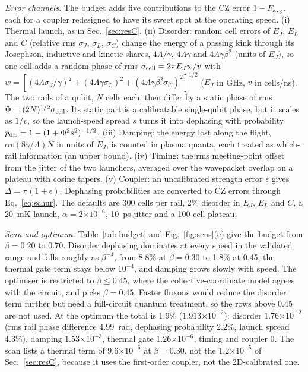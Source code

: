 \documentclass[10pt,twocolumn,letterpaper]{article}
\newcommand{\ee}[1]{\ensuremath{\times10^{#1}}}
\begin{document}
\emph{Error channels.} The budget adds five contributions to the CZ error $1-F_{\rm avg}$, each for a coupler
redesigned to have its sweet spot at the operating speed. (i) Thermal launch, as in Sec.~\ref{sec:resC}. (ii) Disorder:
random cell errors of $E_J$, $E_L$ and $C$ (relative rms $\sigma_J$, $\sigma_L$, $\sigma_C$) change the energy of a
passing kink through its Josephson, inductive and kinetic shares, $4\Lambda/\gamma$, $4\Lambda\gamma$ and
$4\Lambda\gamma\beta^2$ (units of $E_J$), so one cell adds a random phase of rms $\sigma_{\rm cell}=2\pi E_Jw/v$ with
$w=[(4\Lambda\sigma_J/\gamma)^2+(4\Lambda\gamma\sigma_L)^2+(4\Lambda\gamma\beta^2\sigma_C)^2]^{1/2}$ ($E_J$ in GHz, $v$
in cells/ns). The two rails of a qubit, $N$ cells each, then differ by a static phase of rms
$\Phi=(2N)^{1/2}\sigma_{\rm cell}$. Its static part is a calibratable single-qubit phase, but it scales as $1/v$, so the
launch-speed spread $s$ turns it into dephasing with probability $p_{\rm dis}=1-(1+\Phi^2s^2)^{-1/2}$. (iii) Damping:
the energy lost along the flight, $\alpha v(8\gamma/\Lambda)N$ in units of $E_J$, is counted in plasma quanta, each
treated as which-rail information (an upper bound). (iv) Timing: the rms meeting-point offset from the jitter of the two
launchers, averaged over the wavepacket overlap on a plateau with cosine tapers. (v) Coupler: an uncalibrated strength
error $\epsilon$ gives $\Delta=\pi(1+\epsilon)$. Dephasing probabilities are converted to CZ errors through
Eq.~\eqref{eq:schur}. The defaults are 300 cells per rail, 2\% disorder in $E_J$, $E_L$ and $C$, a 20~mK launch,
$\alpha=2\ee{-6}$, 10~ps jitter and a 100-cell plateau.

\emph{Scan and optimum.} Table~\ref{tab:budget} and Fig.~\ref{fig:sens}(e) give the budget from $\beta=0.20$ to 0.70.
Disorder dephasing dominates at every speed in the validated range and falls roughly as $\beta^{-4}$, from 8.8\% at
$\beta=0.30$ to 1.8\% at 0.45; the thermal gate term stays below $10^{-4}$, and damping grows slowly with speed. The
optimiser is restricted to $\beta\le0.45$, where the collective-coordinate model agrees with the circuit, and picks
$\beta=0.45$. Faster fluxons would reduce the disorder term further but need a full-circuit quantum treatment, so the
rows above 0.45 are not used. At the optimum the total is 1.9\% ($1.913\ee{-2}$): disorder $1.76\ee{-2}$ (rms rail phase
difference 4.99~rad, dephasing probability 2.2\%, launch spread 4.3\%), damping $1.53\ee{-3}$, thermal gate
$1.26\ee{-6}$, timing and coupler 0. The scan lists a thermal term of $9.6\ee{-6}$ at $\beta=0.30$, not the $1.2\ee{-5}$ of
Sec.~\ref{sec:resC}, because it uses the first-order coupler, not the 2D-calibrated one.
\end{document}

